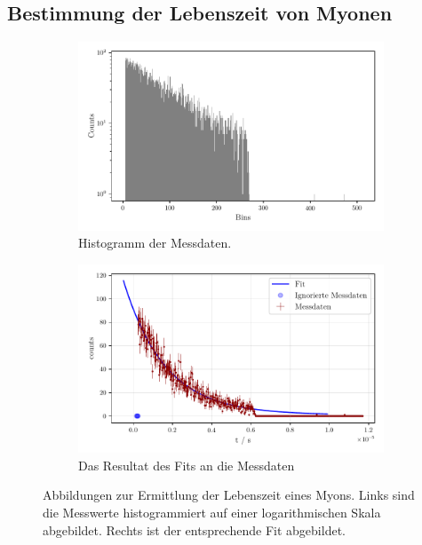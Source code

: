 \subsection{Bestimmung der Lebenszeit von Myonen}

\begin{figure}%
    \begin{subfigure}{0.5\textwidth}%
    \centering%
    \includegraphics[width=\textwidth]{build/myonenhist.pdf}%
    \caption{Histogramm der Messdaten.}%
    \label{fig:histogramm}%
    \end{subfigure}%
    \hfill%
    \begin{subfigure}{0.5\textwidth}%
        \centering%
        \includegraphics[width=\textwidth]{build/myonenfit.pdf}%
        \caption{Das Resultat des Fits an die Messdaten}%
        \label{fig:myonenfit}%
        \end{subfigure}%
    \caption{Abbildungen zur Ermittlung der Lebenszeit eines Myons.
    Links sind die Messwerte histogrammiert auf einer logarithmischen Skala abgebildet.
    Rechts ist der entsprechende Fit abgebildet.}
    \label{subfig:myonen}    
\end{figure}%


